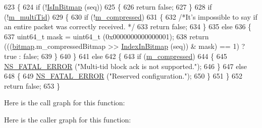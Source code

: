 \begin{DoxyCode}
623 \{
624   \textcolor{keywordflow}{if} (!\hyperlink{classns3_1_1CtrlBAckResponseHeader_ab25d5b7f73ddb3c750365247ca8aa396}{IsInBitmap} (seq))
625     \{
626       \textcolor{keywordflow}{return} \textcolor{keyword}{false};
627     \}
628   \textcolor{keywordflow}{if} (!\hyperlink{classns3_1_1CtrlBAckResponseHeader_ab3b2b175ee54daa240e3cc0450c5812e}{m\_multiTid})
629     \{
630       \textcolor{keywordflow}{if} (!\hyperlink{classns3_1_1CtrlBAckResponseHeader_a7d33c0c452139f1d9f110dab89bfcef7}{m\_compressed})
631         \{
632           \textcolor{comment}{/*It's impossible to say if an entire packet was correctly received. */}
633           \textcolor{keywordflow}{return} \textcolor{keyword}{false};
634         \}
635       \textcolor{keywordflow}{else}
636         \{
637           uint64\_t mask = uint64\_t (0x0000000000000001);
638           \textcolor{keywordflow}{return} (((\hyperlink{classns3_1_1CtrlBAckResponseHeader_a08f2ce2e8665317a7d381e498cc75453}{bitmap}.m\_compressedBitmap >> \hyperlink{classns3_1_1CtrlBAckResponseHeader_aa4c749e3ad38f8b22c9488d9af5053d2}{IndexInBitmap} (seq)) & mask) == 1) ? \textcolor{keyword}{
      true} : \textcolor{keyword}{false};
639         \}
640     \}
641   \textcolor{keywordflow}{else}
642     \{
643       \textcolor{keywordflow}{if} (\hyperlink{classns3_1_1CtrlBAckResponseHeader_a7d33c0c452139f1d9f110dab89bfcef7}{m\_compressed})
644         \{
645           \hyperlink{group__fatal_ga5131d5e3f75d7d4cbfd706ac456fdc85}{NS\_FATAL\_ERROR} (\textcolor{stringliteral}{"Multi-tid block ack is not supported."});
646         \}
647       \textcolor{keywordflow}{else}
648         \{
649           \hyperlink{group__fatal_ga5131d5e3f75d7d4cbfd706ac456fdc85}{NS\_FATAL\_ERROR} (\textcolor{stringliteral}{"Reserved configuration."});
650         \}
651     \}
652   \textcolor{keywordflow}{return} \textcolor{keyword}{false};
653 \}
\end{DoxyCode}


Here is the call graph for this function\+:




Here is the caller graph for this function\+:


